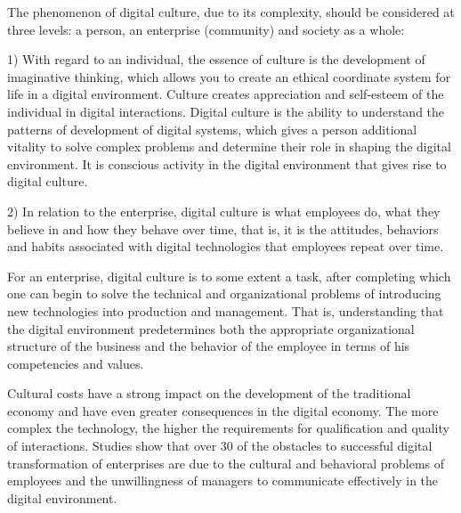 \documentclass{article}
\begin{document}
\begin{multicols}{2}
The phenomenon of digital culture, due to its complexity, should be considered at three levels: a person,
an enterprise (community) and society as a whole:

1) With regard to an individual, the essence of culture
is the development of imaginative thinking, which
allows you to create an ethical coordinate system
for life in a digital environment. Culture creates
appreciation and self-esteem of the individual in
digital interactions. Digital culture is the ability to
understand the patterns of development of digital
systems, which gives a person additional vitality to
solve complex problems and determine their role
in shaping the digital environment. It is conscious
activity in the digital environment that gives rise
to digital culture.

2) In relation to the enterprise, digital culture is what
employees do, what they believe in and how they
behave over time, that is, it is the attitudes, behaviors and habits associated with digital technologies
that employees repeat over time.

For an enterprise, digital culture is to some extent a
task, after completing which one can begin to solve the
technical and organizational problems of introducing new
technologies into production and management. That is,
understanding that the digital environment predetermines
both the appropriate organizational structure of the business and the behavior of the employee in terms of his
competencies and values.

Cultural costs have a strong impact on the development
of the traditional economy and have even greater consequences in the digital economy. The more complex the
technology, the higher the requirements for qualification
and quality of interactions. Studies show that over 30%
of the obstacles to successful digital transformation of
enterprises are due to the cultural and behavioral problems of employees and the unwillingness of managers to
communicate effectively in the digital environment.
\end{multicols}
\end{document}
